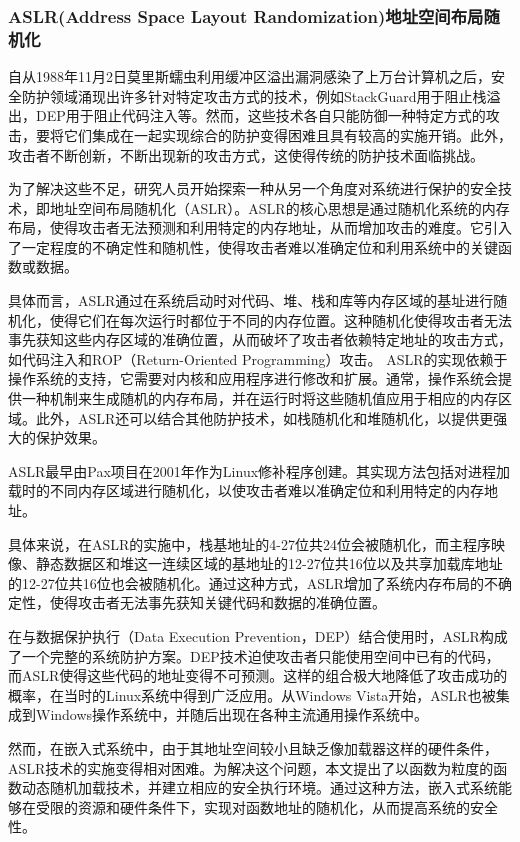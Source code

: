 \documentclass[12pt,a4paper]{ctexart}
\begin{document}
\subsubsection{ASLR(Address Space Layout Randomization)地址空间布局随机化}
\par 自从1988年11月2日莫里斯蠕虫利用缓冲区溢出漏洞感染了上万台计算机之后，安全防护领域涌现出许多针对特定攻击方式的技术，例如StackGuard用于阻止栈溢出，DEP用于阻止代码注入等。然而，这些技术各自只能防御一种特定方式的攻击，要将它们集成在一起实现综合的防护变得困难且具有较高的实施开销。此外，攻击者不断创新，不断出现新的攻击方式，这使得传统的防护技术面临挑战。
\par 为了解决这些不足，研究人员开始探索一种从另一个角度对系统进行保护的安全技术，即地址空间布局随机化（ASLR）。ASLR的核心思想是通过随机化系统的内存布局，使得攻击者无法预测和利用特定的内存地址，从而增加攻击的难度。它引入了一定程度的不确定性和随机性，使得攻击者难以准确定位和利用系统中的关键函数或数据。
\par 具体而言，ASLR通过在系统启动时对代码、堆、栈和库等内存区域的基址进行随机化，使得它们在每次运行时都位于不同的内存位置。这种随机化使得攻击者无法事先获知这些内存区域的准确位置，从而破坏了攻击者依赖特定地址的攻击方式，如代码注入和ROP（Return-Oriented Programming）攻击。
ASLR的实现依赖于操作系统的支持，它需要对内核和应用程序进行修改和扩展。通常，操作系统会提供一种机制来生成随机的内存布局，并在运行时将这些随机值应用于相应的内存区域。此外，ASLR还可以结合其他防护技术，如栈随机化和堆随机化，以提供更强大的保护效果。
\par ASLR最早由Pax项目在2001年作为Linux修补程序创建。其实现方法包括对进程加载时的不同内存区域进行随机化，以使攻击者难以准确定位和利用特定的内存地址。
\par 具体来说，在ASLR的实施中，栈基地址的4-27位共24位会被随机化，而主程序映像、静态数据区和堆这一连续区域的基地址的12-27位共16位以及共享加载库地址的12-27位共16位也会被随机化。通过这种方式，ASLR增加了系统内存布局的不确定性，使得攻击者无法事先获知关键代码和数据的准确位置。
\par 在与数据保护执行（Data Execution Prevention，DEP）结合使用时，ASLR构成了一个完整的系统防护方案。DEP技术迫使攻击者只能使用空间中已有的代码，而ASLR使得这些代码的地址变得不可预测。这样的组合极大地降低了攻击成功的概率，在当时的Linux系统中得到广泛应用。从Windows Vista开始，ASLR也被集成到Windows操作系统中，并随后出现在各种主流通用操作系统中。
\par 然而，在嵌入式系统中，由于其地址空间较小且缺乏像加载器这样的硬件条件，ASLR技术的实施变得相对困难。为解决这个问题，本文提出了以函数为粒度的函数动态随机加载技术，并建立相应的安全执行环境。通过这种方法，嵌入式系统能够在受限的资源和硬件条件下，实现对函数地址的随机化，从而提高系统的安全性。
\end{document}
